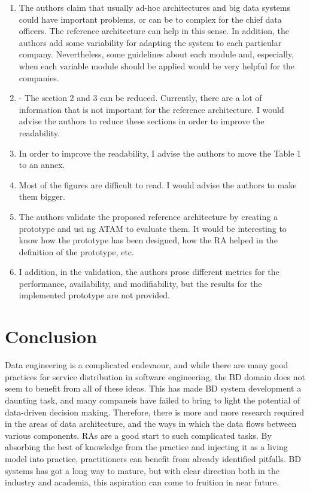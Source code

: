 \documentclass[review]{elsarticle}
\begin{document}
\begin{enumerate}
    \item   The authors claim that usually ad-hoc architectures and big data systems could have important problems, or can be to complex for the chief data officers. The reference architecture can help in this sense. In addition, the authors add some variability for adapting the system to each particular company. Nevertheless, some guidelines about each module and, especially, when each variable module should be applied would be very helpful for the companies.
    \item -       The section 2 and 3 can be reduced. Currently, there are a lot of information that is not important for the reference architecture. I would advise the authors to reduce these sections in order to improve the readability.
    \item        In order to improve the readability, I advise the authors to move the Table 1 to an annex.
    \item   Most of the figures are difficult to read. I would advise the authors to make them bigger.
    \item  The authors validate the proposed reference architecture by creating a prototype and usi ng ATAM to evaluate them. It would be interesting to know how the prototype has been designed, how the RA helped in the definition of the prototype, etc.
    \item   I addition, in the validation, the authors prose different metrics for the performance, availability, and modifiability, but the results for the implemented prototype are not provided.

\end{enumerate}



\section{Conclusion}

Data engineering is a complicated endevaour, and while there are many good practices for service distribution in software engineering, the BD domain does not seem to benefit from all of these ideas. This has made BD system development a daunting task, and many companeis have failed to bring to light the potential of data-driven decision making. Therefore, there is more and more research required in the areas of data architecture, and the ways in which the data flows between various components. RAs are a good start to such complicated tasks. By absorbing the best of knowledge from the practice and injecting it as a living model into practice, practitioners can benefit from already identified pitfalls. BD systems has got a long way to mature, but with clear direction both in the industry and academia, this aspiration can come to fruition in near future.


\end{document}
